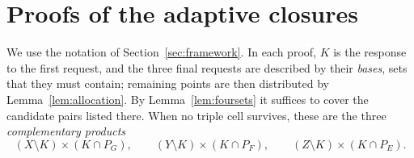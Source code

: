 \documentclass[11pt]{article}
\numberwithin{equation}{section}
\theoremstyle{definition}
\theoremstyle{remark}
\begin{document}
\appendix
\section{Proofs of the adaptive closures}\label{app:adaptive}

We use the notation of Section~\ref{sec:framework}. In each proof, $K$
is the response to the first request, and the three final requests are
described by their \emph{bases}, sets that they must contain; remaining
points are then distributed by Lemma~\ref{lem:allocation}. By
Lemma~\ref{lem:foursets} it suffices to cover the candidate pairs listed
there. When no triple cell survives, these are the three
\emph{complementary products}
\[
 (X\setminus K)\times(K\cap P_G),\qquad
 (Y\setminus K)\times(K\cap P_F),\qquad
 (Z\setminus K)\times(K\cap P_E).
\]
\end{document}

